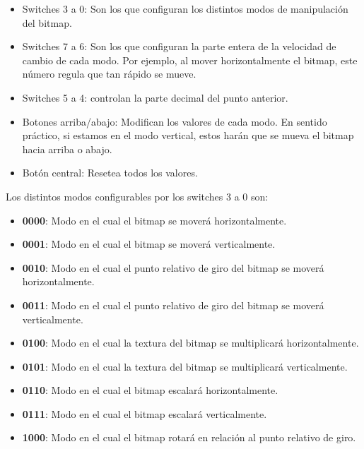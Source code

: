 \begin{itemize}
\item Switches 3 a 0: Son los que configuran los distintos modos de manipulación del bitmap.
\item Switches 7 a 6: Son los que configuran la parte entera de la velocidad de cambio de cada modo. Por ejemplo, al mover horizontalmente el bitmap, este número regula que tan rápido se mueve.
\item Switches 5 a 4: controlan la parte decimal del punto anterior.
\item Botones arriba/abajo: Modifican los valores de cada modo. En sentido práctico, si estamos en el modo vertical, estos harán que se mueva el bitmap hacia arriba o abajo.
\item Botón central: Resetea todos los valores.
\end{itemize}

Los distintos modos configurables por los switches 3 a 0 son:
\begin{itemize}
\item \textbf{0000}: Modo en el cual el bitmap se moverá horizontalmente.
\item \textbf{0001}: Modo en el cual el bitmap se moverá verticalmente.
\item \textbf{0010}: Modo en el cual el punto relativo de giro del bitmap se moverá horizontalmente.
\item \textbf{0011}: Modo en el cual el punto relativo de giro del bitmap se moverá verticalmente.
\item \textbf{0100}: Modo en el cual la textura del bitmap se multiplicará horizontalmente.
\item \textbf{0101}: Modo en el cual la textura del bitmap se multiplicará verticalmente.
\item \textbf{0110}: Modo en el cual el bitmap escalará horizontalmente.
\item \textbf{0111}: Modo en el cual el bitmap escalará verticalmente.
\item \textbf{1000}: Modo en el cual el bitmap rotará en relación al punto relativo de giro.
\end{itemize}

